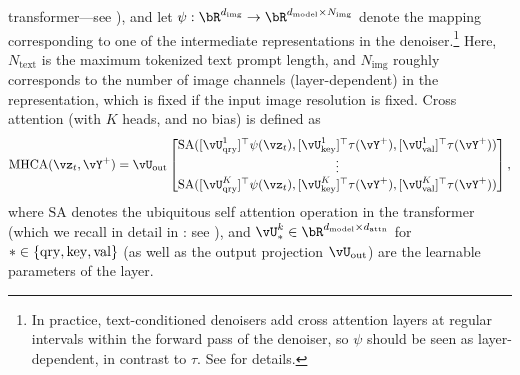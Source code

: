 \documentclass[../../book-main.tex]{subfiles}
\begin{document}
transformer---see ), and let $\psi : \bR^{d_{\mathrm{img}}}
\to \bR^{d_{\mathrm{model}} \times N_{\mathrm{img}}}$ denote the mapping corresponding to one of
the intermediate representations in the denoiser.\footnote{In practice,
text-conditioned denoisers add cross attention layers at regular intervals
within the forward pass of the denoiser, so $\psi$ should be seen as
layer-dependent, in contrast to $\tau$. See \textcite{rombach2022high} for
details.} Here, $N_{\mathrm{text}}$ is the maximum tokenized text prompt length,
and $N_{\mathrm{img}}$ roughly corresponds to the number of image channels
(layer-dependent) in the representation, which is fixed if the input image
resolution is fixed. Cross attention (with $K$ heads, and no bias) is defined as
    \begin{equation}
      \mathrm{MHCA}(\vz_t, \vY^+) \label{eq:mhca}
        = \vU_{\out}\mat{\SA([\vU_{\query}^{1}]^{\top}\psi(\vz_t),
        [\vU_{\attnkey}^{1}]^{\top}\tau(\vY^+), [\vU_{\val}^{1}]^{\top}\tau(\vY^+)) \\ \vdots \\
        \SA([\vU_{\query}^{K}]^{\top}\psi(\vz_t),
        [\vU_{\attnkey}^{K}]^{\top}\tau(\vY^+),
        [\vU_{\val}^{K}]^{\top}\tau(\vY^+))}, %
    \end{equation}
where $\mathrm{SA}$ denotes the ubiquitous self attention operation
in the transformer (which we recall in detail in : see
), and $\vU_{*}^{k} \in \bR^{d_{\mathrm{model}}\times
d_{\mathrm{attn}} }$ for $* \in \set{\mathrm{qry}, \mathrm{key}, \mathrm{val}}$
(as well as the output projection $\vU_{\mathrm{out}}$) are the learnable
parameters of the layer.
\end{document}
